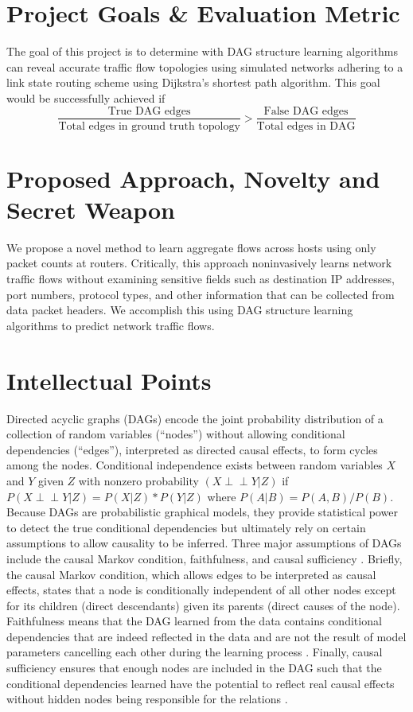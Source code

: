\documentclass[conference]{IEEEtran}
\newcommand\ci{\perp\!\!\!\perp}
\begin{document}
\section{Project Goals \& Evaluation Metric}

The goal of this project is to determine with DAG structure learning algorithms can reveal accurate traffic flow topologies using simulated networks adhering to a link state routing scheme using Dijkstra’s shortest path algorithm. This goal would be successfully achieved if
\[
\frac{\text{True DAG edges}}{\text{Total edges in ground truth topology}} > \frac{\text{False DAG edges}}{\text{Total edges in DAG}}
\]

\section{Proposed Approach, Novelty and Secret Weapon}

We propose a novel method to learn aggregate flows across hosts using only packet counts at routers. Critically, this approach noninvasively learns network traffic flows without examining sensitive fields such as destination IP addresses, port numbers, protocol types, and other information that can be collected from data packet headers. We accomplish this using DAG structure learning algorithms to predict network traffic flows.

\section{Intellectual Points}

Directed acyclic graphs (DAGs) encode the joint probability distribution of a collection of random variables (“nodes”) without allowing conditional dependencies (“edges”), interpreted as directed causal effects, to form cycles among the nodes. Conditional independence exists between random variables $X$ and $Y$ given $Z$ with nonzero probability $\left(X \ci Y | Z \right)$ if $P(X \ci Y | Z) = P(X | Z) * P(Y | Z)$ where $P(A | B) = P(A, B) / P(B)$. Because DAGs are probabilistic graphical models, they provide statistical power to detect the true conditional dependencies but ultimately rely on certain assumptions to allow causality to be inferred. Three major assumptions of DAGs include the causal Markov condition, faithfulness, and causal sufficiency \cite{b6}. Briefly, the causal Markov condition, which allows edges to be interpreted as causal effects, states that a node is conditionally independent of all other nodes except for its children (direct descendants) given its parents (direct causes of the node)\cite{b7}. Faithfulness means that the DAG learned from the data contains conditional dependencies that are indeed reflected in the data and are not the result of model parameters cancelling each other during the learning process \cite{b8}. Finally, causal sufficiency ensures that enough nodes are included in the DAG such that the conditional dependencies learned have the potential to reflect real causal effects without hidden nodes being responsible for the relations \cite{b8}.
\end{document}
